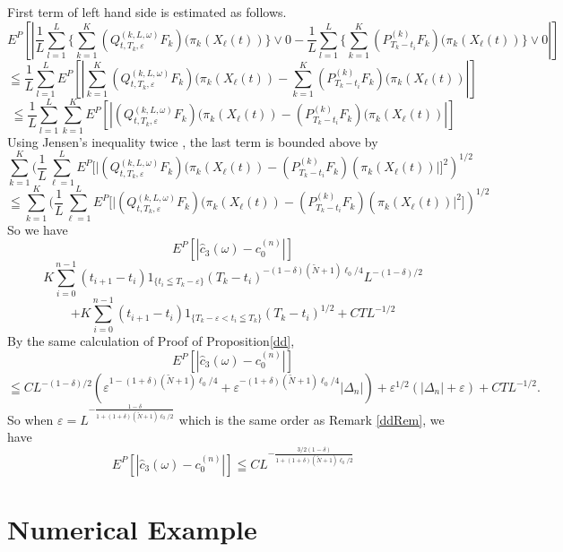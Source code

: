 \documentclass[12pt]{article}
\begin{document}
First term of left hand side is estimated as follows.
$$E^P[|
\frac{1}{L}\sum_{l=1}^L\{\sum_{k=1}^{K} (Q_{t,T_k,\varepsilon}^{(k,L,\omega)}F_k)(\pi_k (X_{\ell}(t))\}\vee 0
-\frac{1}{L}\sum_{l=1}^L\{\sum_{k=1}^{K} (P_{T_k-t_i}^{(k)}F_k)(\pi_k (X_{\ell}(t))\}\vee 0|]$$
$$\leqq \frac{1}{L}\sum_{l=1}^L E^P[|
\sum_{k=1}^{K} (Q_{t,T_k,\varepsilon}^{(k,L,\omega)}F_k)(\pi_k (X_{\ell}(t))
-\sum_{k=1}^{K} (P_{T_k-t_i}^{(k)}F_k)(\pi_k (X_{\ell}(t))|]$$
$$\leqq \frac{1}{L}\sum_{l=1}^L \sum_{k=1}^{K} E^P[|
 (Q_{t,T_k,\varepsilon}^{(k,L,\omega)}F_k)(\pi_k (X_{\ell}(t))
- (P_{T_k-t_i}^{(k)}F_k)(\pi_k (X_{\ell}(t))|]$$
Using Jensen's inequality twice , the last term is bounded above by
$$ \sum_{k=1}^{K}( \frac{1}{L} \sum_{\ell=1}^L E^P[|
 (Q_{t,T_k,\varepsilon}^{(k,L,\omega)}F_k)(\pi_k (X_{\ell}(t))
- (P_{T_k-t_i}^{(k)}F_k)(\pi_k (X_{\ell}(t))|]^2)^{1/2}$$
$$\leqq \sum_{k=1}^{K}( \frac{1}{L} \sum_{\ell=1}^L E^P[|
 (Q_{t,T_k,\varepsilon}^{(k,L,\omega)}F_k)(\pi_k (X_{\ell}(t))
- (P_{T_k-t_i}^{(k)}F_k)(\pi_k (X_{\ell}(t))|^2])^{1/2}$$
So we have
$$E^P[|\hat{c}_3(\omega)-c_0^{(n)}|]$$
$$K \sum_{i=0}^{n-1} (t_{i+1}-t_i) 1_{\{t_i\leqq T_k-\varepsilon\}}(T_k-t_i)^{-(1-\delta)(\tilde{N}+1)\ell_0/4}L^{-(1-\delta)/2}$$
$$+K \sum_{i=0}^{n-1} (t_{i+1}-t_i) 1_{\{T_k-\varepsilon < t_i \leqq T_k\}}(T_k-t_i)^{1/2}+CTL^{-1/2}$$
By the same calculation of Proof of Proposition\ref{dd},
$$E^P[|\hat{c}_3(\omega)-c_0^{(n)}|]$$
$$\leqq C L^{-(1-\delta)/2}(\varepsilon^{1-(1+\delta)(\tilde{N}+1)\ell_0/4} + \varepsilon^{-(1+\delta)(\tilde{N}+1)\ell_0/4} |\Delta_n|)+\varepsilon^{1/2} (|\Delta_n|+\varepsilon)+CTL^{-1/2}.$$
So when $\varepsilon = L^{-\frac{1-\delta}{1+(1+\delta)(\tilde{N}+1)\ell_0/2}}$ which is the same 
order as Remark \ref{ddRem},
we have
$$E^P[|\hat{c}_3(\omega)-c_0^{(n)}|]\leqq C L^{-\frac{3/2(1-\delta)}{1+(1+\delta)(\tilde{N}+1)\ell_0/2}}$$

\section{Numerical Example}\label{sec:nume}
\end{document}
